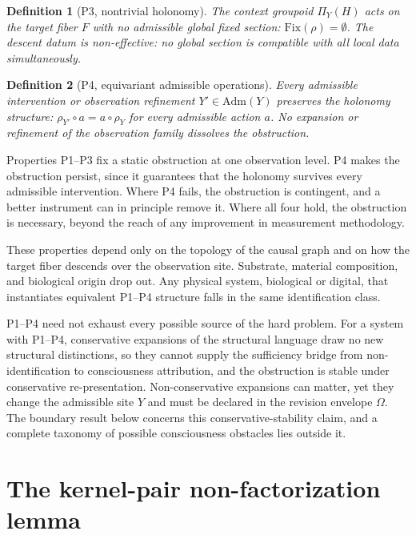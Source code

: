 \documentclass[11pt]{article}
\newtheorem{definition}{Definition}
\begin{document}
\begin{definition}[P3, nontrivial holonomy]
The context groupoid $\Pi_Y(H)$ acts on the target fiber $F$ with no admissible
global fixed section: $\mathrm{Fix}(\rho) = \emptyset$.
The descent datum is non-effective: no global section is compatible with all
local data simultaneously.
\end{definition}

\begin{definition}[P4, equivariant admissible operations]
Every admissible intervention or observation refinement $Y' \in \mathrm{Adm}(Y)$
preserves the holonomy structure:
$\rho_{Y'} \circ a = a \circ \rho_Y$ for every admissible action $a$.
No expansion or refinement of the observation family dissolves the obstruction.
\end{definition}

Properties P1--P3 fix a static obstruction at one observation level. P4 makes
the obstruction persist, since it guarantees that the holonomy survives every
admissible intervention. Where P4 fails, the obstruction is contingent, and a
better instrument can in principle remove it. Where all four hold, the
obstruction is necessary, beyond the reach of any improvement in measurement
methodology.

These properties depend only on the topology of the causal graph and on how the
target fiber descends over the observation site. Substrate, material
composition, and biological origin drop out. Any physical system, biological or
digital, that instantiates equivalent P1--P4 structure falls in the same
identification class.

P1--P4 need not exhaust every possible source of the hard problem. For a system
with P1--P4, conservative expansions of the
structural language draw no new structural distinctions, so they cannot supply
the sufficiency bridge from non-identification to consciousness attribution, and
the obstruction is stable under conservative re-presentation.
Non-conservative expansions can matter, yet they change the admissible site $Y$
and must be declared in the revision envelope $\Omega$. The boundary result
below concerns this conservative-stability claim, and a complete taxonomy of
possible consciousness obstacles lies outside it.

\section{The kernel-pair non-factorization lemma}
\label{sec:kernelpair}
\end{document}
